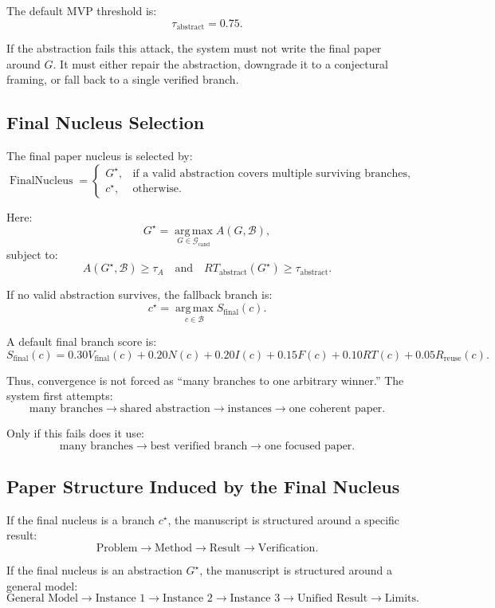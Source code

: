 \documentclass[11pt]{article}
\begin{document}
The default MVP threshold is:
$$
\tau_{\text{abstract}}=0.75.
$$

If the abstraction fails this attack, the system must not write the final paper around $G$. It must either repair the abstraction, downgrade it to a conjectural framing, or fall back to a single verified branch.

\subsection{Final Nucleus Selection}

The final paper nucleus is selected by:
$$
\operatorname{FinalNucleus}
=
\begin{cases}
G^\star, & \text{if a valid abstraction covers multiple surviving branches},\\
c^\star, & \text{otherwise}.
\end{cases}
$$

Here:
$$
G^\star
=
\operatorname*{arg\,max}_{G\in\mathcal{G}_{\text{cand}}}
A(G,\mathcal{B}),
$$
subject to:
$$
A(G^\star,\mathcal{B})\geq\tau_A
\quad\text{and}\quad
RT_{\text{abstract}}(G^\star)\geq\tau_{\text{abstract}}.
$$

If no valid abstraction survives, the fallback branch is:
$$
c^\star
=
\operatorname*{arg\,max}_{c\in\mathcal{B}}
S_{\text{final}}(c).
$$

A default final branch score is:
$$
S_{\text{final}}(c)
=
0.30V_{\text{final}}(c)
+
0.20N(c)
+
0.20I(c)
+
0.15F(c)
+
0.10RT(c)
+
0.05R_{\text{reuse}}(c).
$$

Thus, convergence is not forced as ``many branches to one arbitrary winner.'' The system first attempts:
$$
\text{many branches}
\rightarrow
\text{shared abstraction}
\rightarrow
\text{instances}
\rightarrow
\text{one coherent paper}.
$$

Only if this fails does it use:
$$
\text{many branches}
\rightarrow
\text{best verified branch}
\rightarrow
\text{one focused paper}.
$$

\subsection{Paper Structure Induced by the Final Nucleus}

If the final nucleus is a branch $c^\star$, the manuscript is structured around a specific result:
$$
\text{Problem}
\rightarrow
\text{Method}
\rightarrow
\text{Result}
\rightarrow
\text{Verification}.
$$

If the final nucleus is an abstraction $G^\star$, the manuscript is structured around a general model:
$$
\text{General Model}
\rightarrow
\text{Instance 1}
\rightarrow
\text{Instance 2}
\rightarrow
\text{Instance 3}
\rightarrow
\text{Unified Result}
\rightarrow
\text{Limits}.
$$
\end{document}
